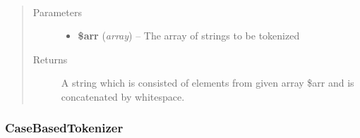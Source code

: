 \documentclass[letterpaper,10pt,english]{sphinxmanual}
\begin{document}
\begin{fulllineitems}

\begin{fulllineitems}
\label{docs/api:Tokenizer::arrayToString}~\begin{quote}\begin{description}
\item[{Parameters}] \leavevmode\begin{itemize}
\item {} 
\textbf{\$arr} (\emph{array}) -- The array of strings to be tokenized

\end{itemize}

\item[{Returns}] \leavevmode
A string which is consisted of elements from given array \$arr and is concatenated by whitespace.

\end{description}\end{quote}

\end{fulllineitems}


\end{fulllineitems}



\subsubsection{CaseBasedTokenizer}
\label{docs/api:casebasedtokenizer}
\end{document}
